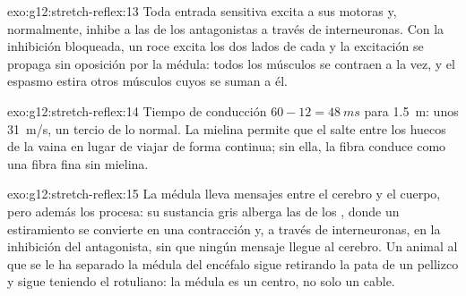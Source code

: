 \begin{solution}{exo:g12:stretch-reflex:13}
Toda entrada sensitiva excita a sus  motoras y, normalmente,
inhibe a las de los antagonistas a través de interneuronas. Con la
inhibición bloqueada, un roce excita los dos lados de cada
 y la excitación se propaga sin oposición por la médula:
todos los músculos se contraen a la vez, y el espasmo estira otros
músculos cuyos  se suman a él.
\end{solution}

\begin{solution}{exo:g12:stretch-reflex:14}
Tiempo de conducción $60 - 12 = \qty{48}{ms}$ para \qty{1.5}{m}: unos
\qty{31}{m/s}, un tercio de lo normal. La mielina permite que el
 salte entre los huecos de la vaina en lugar de
viajar de forma continua; sin ella, la fibra conduce como una fibra
fina sin mielina.
\end{solution}

\begin{solution}{exo:g12:stretch-reflex:15}
La médula lleva mensajes entre el cerebro y el cuerpo, pero además los
procesa: su sustancia gris alberga las  de los ,
donde un estiramiento se convierte en una contracción y, a través de
interneuronas, en la inhibición del antagonista, sin que ningún mensaje
llegue al cerebro. Un animal al que se le ha separado la médula del
encéfalo sigue retirando la pata de un pellizco y sigue teniendo el
 rotuliano: la médula es un centro, no solo un cable.
\end{solution}


